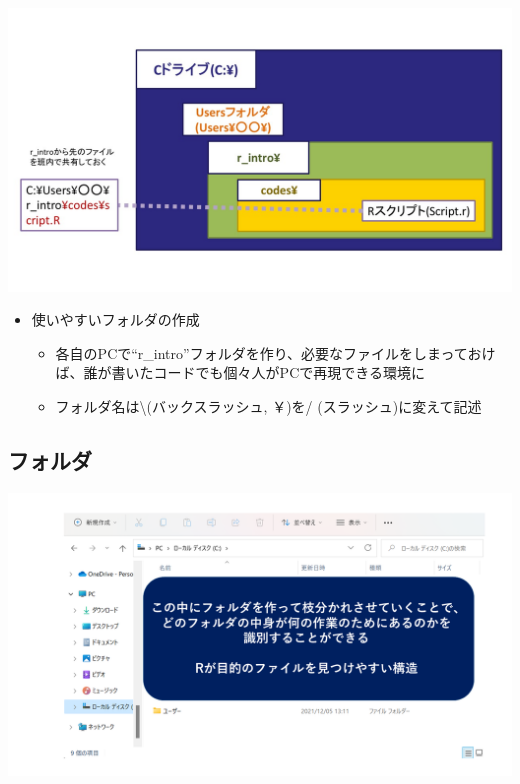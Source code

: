 \documentclass[
]{ltjsarticle}
\providecommand{\tightlist}{%
  \setlength{\itemsep}{0pt}\setlength{\parskip}{0pt}}
\begin{document}
\begin{center}\includegraphics[width=0.77\linewidth]{figs/folder} \end{center}

\begin{itemize}
\tightlist
\item
  使いやすいフォルダの作成

  \begin{itemize}
  \tightlist
  \item
    各自のPCで``r\_intro''フォルダを作り、必要なファイルをしまっておけば、誰が書いたコードでも個々人がPCで再現できる環境に
  \item
    フォルダ名は\textbackslash(バックスラッシュ, ￥)を/
    (スラッシュ)に変えて記述
  \end{itemize}
\end{itemize}

\hypertarget{ux30d5ux30a9ux30ebux30c0}{%
\subsection{フォルダ}\label{ux30d5ux30a9ux30ebux30c0}}

\begin{center}\includegraphics[width=0.95\linewidth]{figs/directory_system} \end{center}
\end{document}
